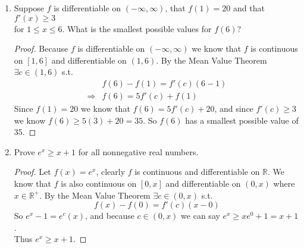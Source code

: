 \documentclass[12pt]{article}
\begin{document}
\begin{enumerate}
    \item Suppose $f$ is differentiable on $(-\infty, \infty)$, that $f(1) = 20$ and that $f'(x) \geq 3$ \\
    for $1 \leq x \leq 6$. What is the smallest possible values for $f(6)$?
    \begin{proof}
        Because $f$ is differentiable on $(-\infty, \infty)$ we know that $f$ is continuous on $[1,6]$ 
        and differentiable on $(1,6)$. By the Mean Value Theorem $\exists c \in (1, 6)$ s.t.
        \begin{align*}
            &f(6)-f(1) = f'(c)(6-1) \\
            \Rightarrow &f(6) = 5f'(c) + f(1)
        \end{align*}
        Since $f(1) = 20$ we know that $f(6) = 5f'(c) + 20$, and since $f'(c) \geq 3$ we know 
        $f(6) \geq 5(3) + 20 = 35$. So $f(6)$ has a smallest possible value of $35$.
    \end{proof}

    \item Prove $e^x \geq x+1$ for all nonnegative real numbers.
    \begin{proof}
        Let $f(x) = e^x$, clearly $f$ is continuous and differentiable on $\mathbb{R}$. We know that 
        $f$ is also continuous on $[0,x]$ and differentiable on $(0,x)$ where $x \in \mathbb{R}^+$. By the Mean 
        Value Theorem $\exists c \in (0,x)$ s.t. 
        \[f(x)-f(0) = f'(c)(x-0)\]
        So $e^{x}-1 = e^c(x)$, and because $c \in (0,x)$ we can say $e^x \geq xe^0+1 = x+1$. \\
        Thus $e^x \geq x+1$.
    \end{proof}
\end{enumerate}
\end{document}
